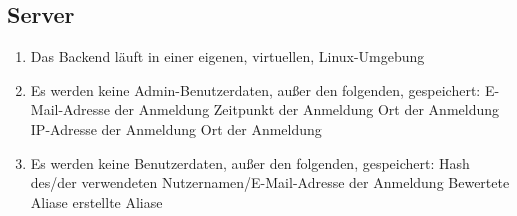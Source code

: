 \subsection{Server}

\begin{enumerate}
    \item Das Backend läuft in einer eigenen, virtuellen, Linux-Umgebung
    \item Es werden keine Admin-Benutzerdaten, außer den folgenden, gespeichert:
        \subitem E-Mail-Adresse der Anmeldung
        \subitem Zeitpunkt der Anmeldung
        \subitem Ort der Anmeldung
        \subitem IP-Adresse der Anmeldung
        \subitem Ort der Anmeldung
    \item Es werden keine Benutzerdaten, außer den folgenden, gespeichert:
        \subitem Hash des/der verwendeten Nutzernamen/E-Mail-Adresse der Anmeldung
        \subitem Bewertete Aliase
        \subitem erstellte Aliase
\end{enumerate}